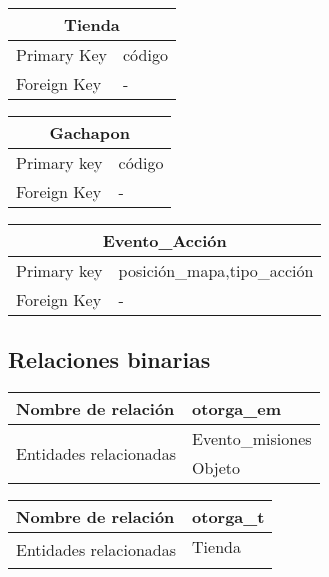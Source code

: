 \documentclass{report}
\begin{document}
\begin{center}    
    \begin{tabular}{|p{3cm}|p{5cm}|}
    \hline
    \multicolumn{2}{|c|}{Tienda} \\ 
    \hline
    \hline
    Primary Key& código\\ 
    \hline
    Foreign Key &-\\ 
    \hline
    \end{tabular}
\end{center}

\begin{center}    
    \begin{tabular}{|p{3cm}|p{5cm}|}
    \hline
    \multicolumn{2}{|c|}{Gachapon} \\ 
    \hline
    \hline
    Primary key&código\\
    \hline
    Foreign Key &-\\ 
    \hline
    \end{tabular}
\end{center}

\begin{center}    
    \begin{tabular}{|p{3cm}|p{5cm}|}
    \hline
    \multicolumn{2}{|c|}{Evento\_Acción} \\ 
    \hline
    \hline
    Primary key&posición\_mapa,tipo\_acción\\
    \hline
    Foreign Key &-\\ 
    \hline
    \end{tabular}
\end{center}

\subsection{Relaciones binarias}

\begin{center}    
    \begin{tabular}{|p{3cm}|p{5cm}|}
    \hline
    Nombre de relación& otorga\_em\\ 
    \hline
    \hline
    \multirow{2}{6em}{Entidades relacionadas}&Evento\_misiones \\ &Objeto\\ 
    \hline
    \end{tabular}
\end{center}

\begin{center}    
    \begin{tabular}{|p{3cm}|p{5cm}|}
    \hline
    Nombre de relación& otorga\_t\\ 
    \hline
    \hline
    \multirow{2}{6em}{Entidades relacionadas}&Tienda \\ Objeto\\ 
    \hline
    \end{tabular}
\end{center}
\end{document}
